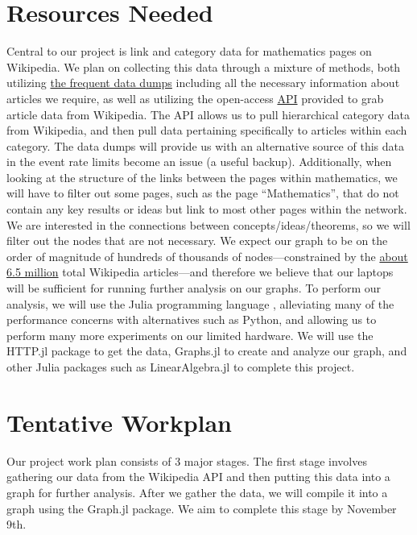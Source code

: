 \documentclass[10pt]{paper}
\begin{document}
\section{Resources Needed}
Central to our project is link and category data for mathematics pages on Wikipedia. We plan on collecting this data through a mixture of methods, both utilizing \href{https://dumps.wikimedia.org/}{the frequent data dumps} including all the necessary information about articles we require, as well as utilizing the open-access \href{https://www.mediawiki.org/wiki/API:Main_page}{API} provided to grab article data from Wikipedia. 
The API allows us to pull hierarchical category data from Wikipedia, and then pull data pertaining specifically to articles within each category. The data dumps will provide us with an alternative source of this data in the event rate limits become an issue (a useful backup). 
Additionally, when looking at the structure of the links between the pages within mathematics, we will have to filter out some pages, such as the page “Mathematics”, that do not contain any key results or ideas but link to most other pages within the network. 
We are interested in the connections between concepts/ideas/theorems, so we will filter out the nodes that are not necessary. 
We expect our graph to be on the order of magnitude of hundreds of thousands of nodes---constrained by the \href{https://en.wikipedia.org/wiki/Wikipedia:Size_of_Wikipedia}{about 6.5 million} total Wikipedia articles---and therefore we believe that our laptops will be sufficient for running further analysis on our graphs. 
To perform our analysis, we will use the Julia programming language \cite{bezanson2017julia}, alleviating many of the performance concerns with alternatives such as Python, and allowing us to perform many more experiments on our limited hardware.
We will use the HTTP.jl package to get the data, Graphs.jl \cite{Graphs2021} to create and analyze our graph, and other Julia packages such as LinearAlgebra.jl to complete this project.

\section{Tentative Workplan}
Our project work plan consists of 3 major stages. The first stage involves gathering our data from the Wikipedia API and then putting this data into a graph for further analysis. 
After we gather the data, we will compile it into a graph using the Graph.jl package. We aim to complete this stage by November 9th. 
\end{document}

